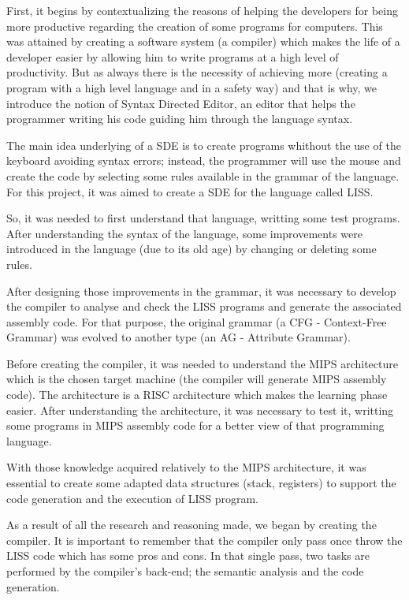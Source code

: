 \documentclass[
  oneside,
  11pt, a4paper,
  footinclude=true,
  headinclude=true,
  cleardoublepage=empty
]{scrbook}
\begin{document}
First, it begins by contextualizing the reasons of helping the developers for being more productive regarding the creation of some programs for computers. This was attained by creating a software system (a compiler) which makes the life of a developer easier by allowing him to write programs at a high level  of productivity. 
But as always there is the necessity of achieving more (creating a program with a high level language and in a safety way) and that is why, we introduce the notion of Syntax Directed Editor, an editor that helps the programmer writing his code guiding him through the language syntax. 

The main idea underlying of a SDE is to create programs whithout the use of the keyboard avoiding syntax errors; instead, the programmer will use the mouse and create the code by selecting some rules available in the grammar of the language.
For this project, it was aimed to create a SDE for the language called LISS.

So, it was needed to first understand that language, writting some test programs.
After understanding the syntax of the language, some improvements were introduced in the language (due to its old age) by changing or deleting some rules.

After designing those improvements in the grammar, it was necessary to develop the compiler to analyse and check the LISS programs and generate the associated assembly code. For that purpose, the original grammar (a CFG - Context-Free Grammar) was evolved to another type (an AG - Attribute Grammar).

Before creating the compiler, it was needed to understand the MIPS architecture which is the chosen target machine (the compiler will generate MIPS assembly code). The architecture is a RISC architecture which makes the learning phase easier. After understanding the architecture, it was necessary to test it, writting some programs in MIPS assembly code for a better view of that programming language.

With those knowledge acquired relatively to the MIPS architecture, it was essential to create some adapted data structures (stack, registers) to support the code generation and the execution of LISS program.

As a result of all the research and reasoning made, we began by creating the compiler. It is important to remember that the compiler only pass once throw the LISS code which has some pros and cons. In that single pass, two tasks are performed by the compiler's back-end; the semantic analysis and the code generation. 
\end{document}
